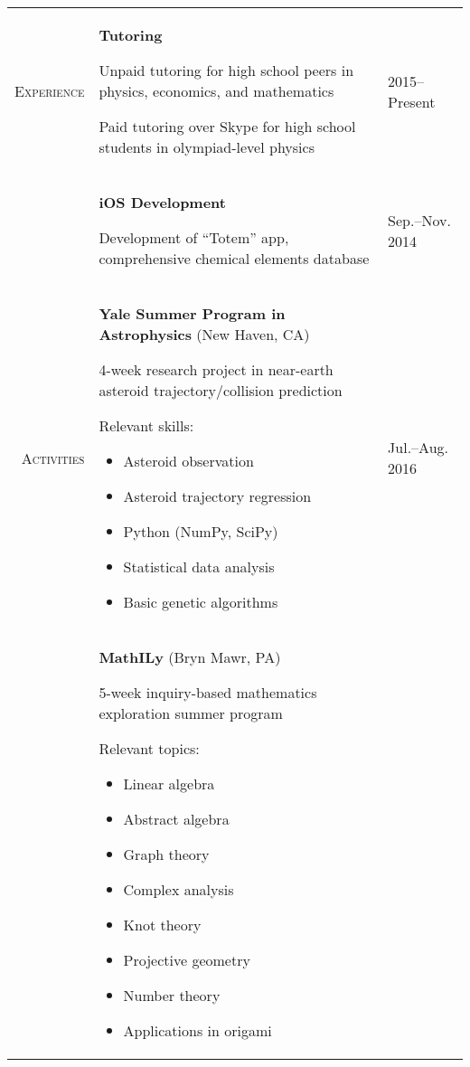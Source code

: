 \documentclass[8pt]{extarticle}
\makeatletter
\newcommand{\compress}{\@minipagetrue}
\newcommand{\location}[1]{(#1)}
\newcommand{\name}[1]{\textbf{#1}\hspace{1em}}
\newcommand{\cat}[1]{#1:}
\makeatother
\begin{document}
\begin{center}
\begin{tabularx}{\textwidth}{>{\scshape}r >{\compress}X | >{\footnotesize\scshape}l}
\\

Experience

&

\name{Tutoring}

Unpaid tutoring for high school peers in physics, economics, and mathematics

Paid tutoring over Skype for high school students in olympiad-level physics

&

2015--Present

\\

&

\name{iOS Development}

Development of ``Totem'' app, comprehensive chemical elements database

&

Sep.--Nov. 2014

\\

Activities

&

\name{Yale Summer Program in Astrophysics} \location{New Haven, CA}

4-week research project in near-earth asteroid trajectory/collision prediction

\cat{Relevant skills}
\begin{multicols}{2}
\begin{itemize}
\item Asteroid observation 
\item Asteroid trajectory regression
\item Python (NumPy, SciPy)
\item Statistical data analysis 
\item Basic genetic algorithms
\end{itemize}
\end{multicols}

&

Jul.--Aug. 2016

\\

&

\name{MathILy} \location{Bryn Mawr, PA}

5-week inquiry-based mathematics exploration summer program

\cat{Relevant topics}
\begin{multicols}{2}
\begin{itemize}
\item Linear algebra
\item Abstract algebra
\item Graph theory
\item Complex analysis
\item Knot theory
\item Projective geometry
\item Number theory
\item Applications in origami
\end{itemize}
\end{multicols}


\end{tabularx}
\end{center}
\end{document}
